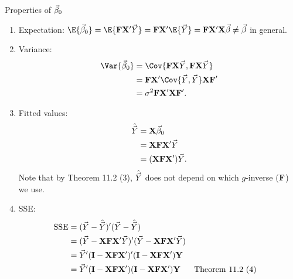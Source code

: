 \begin{Remark}{Properties of $ \vec{\beta}_0 $}{}
    \begin{enumerate}[(1)]
        \item Expectation: $ \E{\Vector{\beta}_0}=\E{\Matrix{F}\Matrix{X}'\Vector{Y}}=\Matrix{F}\Matrix{X}'\E{\Vector{Y}}=\Matrix{F}\Matrix{X}'\Matrix{X}\Vector{\beta}\ne \Vector{\beta} $
              in general.
        \item Variance:
              \begin{align*}
                  \Var{\Vector{\beta}_0}
                   & =\Cov{\Matrix{F}\Matrix{X}\Vector{Y},\Matrix{F}\Matrix{X}\Vector{Y}}   \\
                   & =\Matrix{F}\Matrix{X}'\Cov{\Vector{Y},\Vector{Y}}\Matrix{X}\Matrix{F}' \\
                   & =\sigma^2 \Matrix{F}\Matrix{X}'\Matrix{X}\Matrix{F}'.
              \end{align*}
        \item Fitted values:
              \begin{align*}
                  \hat{\vec{Y}}
                   & =\mathbf{X}\vec{\beta}_0                   \\
                   & =\mathbf{X}\mathbf{F}\mathbf{X}'\vec{Y}    \\
                   & =(\mathbf{X}\mathbf{F}\mathbf{X}')\vec{Y}.
              \end{align*}
              Note that by Theorem 11.2 (3), $ \hat{\vec{Y}} $ does not depend on which
              $ g $-inverse ($ \mathbf{F} $) we use.
        \item SSE\@:
              \begin{align*}
                  \SSE
                   & =(\Vector{Y}-\hat{\Vector{Y}})'(\Vector{Y}-\hat{\Vector{Y}})                                                                                 \\
                   & =(\Vector{Y}-\Matrix{X}\Matrix{F}\Matrix{X}'\Vector{Y})'(\Vector{Y}-\Matrix{X}\Matrix{F}\Matrix{X}'\Vector{Y})                               \\
                   & =\Vector{Y}'(\Matrix{I}-\Matrix{X}\Matrix{F}\Matrix{X}')'(\Matrix{I}-\Matrix{X}\Matrix{F}\Matrix{X}')\Matrix{Y}                              \\
                   & =\Vector{Y}'(\Matrix{I}-\Matrix{X}\Matrix{F}\Matrix{X}')(\Matrix{I}-\Matrix{X}\Matrix{F}\Matrix{X}')\Matrix{Y}  &  & \text{Theorem 11.2 (4)} \\

\end{align*}
\end{enumerate}
\end{Remark}
